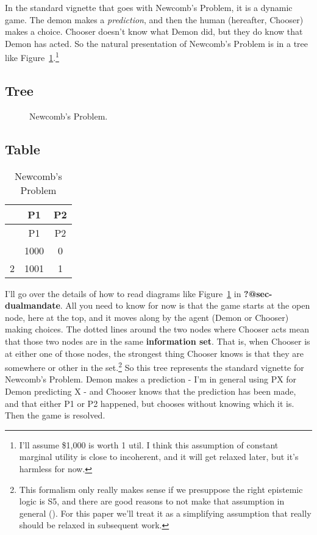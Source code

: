 \documentclass[
  10pt,
  letterpaper,
  DIV=11,
  numbers=noendperiod,
  twoside]{scrartcl}
\begin{document}
In the standard vignette that goes with Newcomb's Problem, it is a
dynamic game. The demon makes a \emph{prediction}, and then the human
(hereafter, Chooser) makes a choice. Chooser doesn't know what Demon
did, but they do know that Demon has acted. So the natural presentation
of Newcomb's Problem is in a tree like
Figure~\ref{fig-standard-newcomb}.\footnote{I'll assume \$1,000 is worth
  1 util. I think this assumption of constant marginal utility is close
  to incoherent, and it will get relaxed later, but it's harmless for
  now.}

\subsection{Tree}

\begin{figure}


\caption{\label{fig-standard-newcomb}Newcomb's Problem.}

\end{figure}%

\subsection{Table}

\begin{longtable}[]{@{}ccc@{}}
\caption{Newcomb's Problem}\label{tbl-standard-newcomb}\tabularnewline
\toprule\noalign{}
& P1 & P2 \\
\midrule\noalign{}
\endfirsthead
\toprule\noalign{}
& P1 & P2 \\
\midrule\noalign{}
\endhead
\bottomrule\noalign{}
\endlastfoot
1 & 1000 & 0 \\
2 & 1001 & 1 \\
\end{longtable}

I'll go over the details of how to read diagrams like
Figure~\ref{fig-standard-newcomb} in \textbf{?@sec-dualmandate}. All you
need to know for now is that the game starts at the open node, here at
the top, and it moves along by the agent (Demon or Chooser) making
choices. The dotted lines around the two nodes where Chooser acts mean
that those two nodes are in the same \textbf{information set}. That is,
when Chooser is at either one of those nodes, the strongest thing
Chooser knows is that they are somewhere or other in the set.\footnote{This
  formalism only really makes sense if we presuppose the right epistemic
  logic is S5, and there are good reasons to not make that assumption in
  general ().
  For this paper we'll treat it as a simplifying assumption that really
  should be relaxed in subsequent work.} So this tree represents the
standard vignette for Newcomb's Problem. Demon makes a prediction - I'm
in general using PX for Demon predicting X - and Chooser knows that the
prediction has been made, and that either P1 or P2 happened, but chooses
without knowing which it is. Then the game is resolved.
\end{document}
